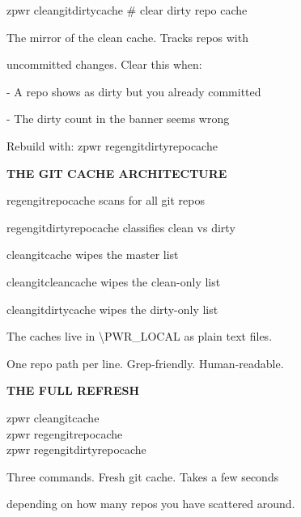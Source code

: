 \documentclass[11pt,a4paper,twoside]{book}
\begin{document}
\begin{codebox}
zpwr cleangitdirtycache             \# clear dirty repo cache\\
\end{codebox}

The mirror of the clean cache. Tracks repos with

uncommitted changes. Clear this when:

- A repo shows as dirty but you already committed

- The dirty count in the banner seems wrong

\begin{codebox}
Rebuild with: zpwr regengitdirtyrepocache\\
\end{codebox}


\vspace{12pt}
{\bfseries\color{neonyellow} THE GIT CACHE ARCHITECTURE}\vspace{4pt}

\begin{codebox}
regengitrepocache        scans for all git repos\\
\end{codebox}

regengitdirtyrepocache   classifies clean vs dirty

cleangitcache            wipes the master list

cleangitcleancache       wipes the clean-only list

cleangitdirtycache       wipes the dirty-only list

The caches live in \textbackslash{}PWR\_LOCAL as plain text files.

One repo path per line. Grep-friendly. Human-readable.


\vspace{12pt}
{\bfseries\color{neonyellow} THE FULL REFRESH}\vspace{4pt}

\begin{codebox}
zpwr cleangitcache\\
zpwr regengitrepocache\\
zpwr regengitdirtyrepocache\\
\end{codebox}

Three commands. Fresh git cache. Takes a few seconds

depending on how many repos you have scattered around.


\vspace{16pt}
\end{document}
